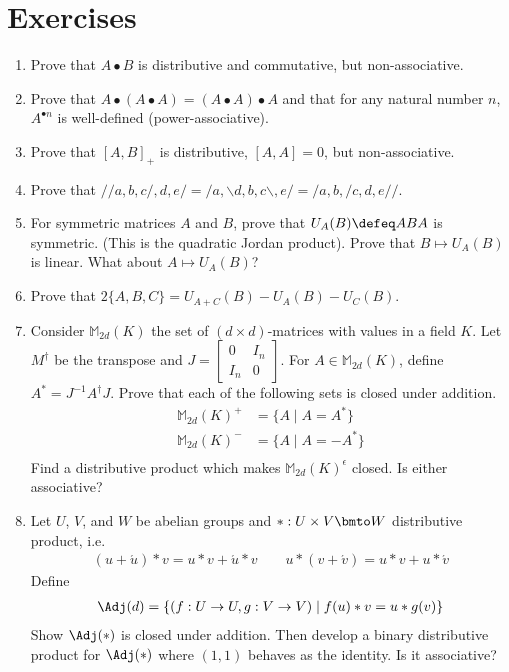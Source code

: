 \section*{Exercises}
\begin{enumerate}
\item Prove that $A\bullet B$ is distributive and commutative, but non-associative.
\item Prove that $A\bullet (A\bullet A)=(A\bullet A)\bullet A$ and that 
for any natural number $n$, $A^{\bullet n}$ is well-defined (power-associative).

\item Prove that $[A,B]_+$ is distributive, $[A,A]=0$, but non-associative.

\item Prove that $//a,b,c/,d,e/=/a,\backslash d,b,c\backslash,e/=/a,b,/c,d,e//$.

\item For symmetric matrices $A$ and $B$, prove that $U_A(B)\defeq ABA$ is symmetric.
(This is the quadratic Jordan product).  Prove that $B\mapsto U_A(B)$ is linear.  What 
about $A\mapsto U_A(B)$?

\item Prove that $2\{A,B,C\}=U_{A+C}(B)-U_A(B)-U_C(B)$.


\item Consider $\mathbb{M}_{2d}(K)$ the set of $(d\times d)$-matrices with values 
in a field $K$.  Let $M^{\dagger}$ be the transpose and $J=\begin{bmatrix} 0 & I_n\\ I_n & 0 \end{bmatrix}$.
For $A\in \mathbb{M}_{2d}(K)$, define $A^*=J^{-1} A^{\dagger}J$.  Prove that each 
of the following sets is closed under addition.
\begin{align*}
    \mathbb{M}_{2d}(K)^+ & = \{ A\mid A=A^*\}\\
    \mathbb{M}_{2d}(K)^- & = \{ A\mid A=-A^*\}\\
\end{align*}
Find a distributive product which makes $\mathbb{M}_{2d}(K)^{\epsilon}$ closed.  Is either associative?

\item Let $U$, $V$, and $W$  be abelian groups and $*:U\times V\bmto W$ distributive product, i.e.\ 
\begin{gather*}
    (u+\acute{u})*v = u*v+\acute{u}*v \qquad 
    u*(v+\acute{v})= u*v+u*\acute{v}
\end{gather*}
Define 
\begin{gather*}
    \Adj(d) =\{
        (f:U\to U, g:V\to V)\mid 
        f(u)*v = u*g(v)
    \}
\end{gather*}
Show $\Adj(*)$ is closed under addition.  Then develop a binary distributive product 
for $\Adj(*)$ where $(1,1)$ behaves as the identity.  Is it associative?


\end{enumerate}
